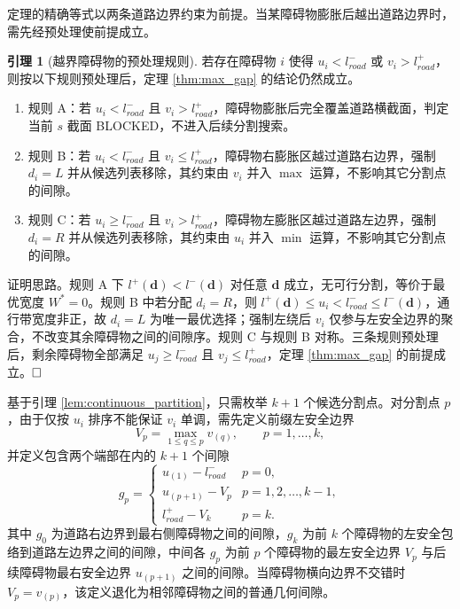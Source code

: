 \documentclass[a4paper,11pt]{ctexart}
\theoremstyle{definition}
\newtheorem{lemma}{引理}[section]
\begin{document}
定理的精确等式以两条道路边界约束为前提。当某障碍物膨胀后越出道路边界时，需先经预处理使前提成立。

\begin{lemma}[越界障碍物的预处理规则]
\label{lem:boundary_trim}
若存在障碍物 $i$ 使得 $u_i < l_{road}^{-}$ 或 $v_i > l_{road}^{+}$，则按以下规则预处理后，定理 \ref{thm:max_gap} 的结论仍然成立。
\begin{enumerate}
    \item 规则 A：若 $u_i < l_{road}^{-}$ 且 $v_i > l_{road}^{+}$，障碍物膨胀后完全覆盖道路横截面，判定当前 $s$ 截面 BLOCKED，不进入后续分割搜索。
    \item 规则 B：若 $u_i < l_{road}^{-}$ 且 $v_i \leq l_{road}^{+}$，障碍物右膨胀区越过道路右边界，强制 $d_i = L$ 并从候选列表移除，其约束由 $v_i$ 并入 $\max$ 运算，不影响其它分割点的间隙。
    \item 规则 C：若 $u_i \geq l_{road}^{-}$ 且 $v_i > l_{road}^{+}$，障碍物左膨胀区越过道路左边界，强制 $d_i = R$ 并从候选列表移除，其约束由 $u_i$ 并入 $\min$ 运算，不影响其它分割点的间隙。
\end{enumerate}
\end{lemma}

证明思路。规则 A 下 $l^{+}(\mathbf{d}) < l^{-}(\mathbf{d})$ 对任意 $\mathbf{d}$ 成立，无可行分割，等价于最优宽度 $W^{*}=0$。规则 B 中若分配 $d_i = R$，则 $l^{+}(\mathbf{d}) \leq u_i < l_{road}^{-} \leq l^{-}(\mathbf{d})$，通行带宽度非正，故 $d_i = L$ 为唯一最优选择；强制左绕后 $v_i$ 仅参与左安全边界的聚合，不改变其余障碍物之间的间隙序。规则 C 与规则 B 对称。三条规则预处理后，剩余障碍物全部满足 $u_j \geq l_{road}^{-}$ 且 $v_j \leq l_{road}^{+}$，定理 \ref{thm:max_gap} 的前提成立。$\hfill\Box$

基于引理 \ref{lem:continuous_partition}，只需枚举 $k+1$ 个候选分割点。对分割点 $p$，由于仅按 $u_i$ 排序不能保证 $v_i$ 单调，需先定义前缀左安全边界
\begin{equation}
    V_p = \max_{1 \leq q \leq p} v_{(q)}, \qquad p = 1, \ldots, k,
    \label{eq:prefix_v}
\end{equation}
并定义包含两个端部在内的 $k+1$ 个间隙
\begin{equation}
    g_p = \begin{cases}
        u_{(1)} - l_{road}^{-} & p = 0, \\[0.3em]
        u_{(p+1)} - V_p & p = 1, 2, \ldots, k-1, \\[0.3em]
        l_{road}^{+} - V_k & p = k.
    \end{cases}
    \label{eq:gap_def}
\end{equation}
其中 $g_0$ 为道路右边界到最右侧障碍物之间的间隙，$g_k$ 为前 $k$ 个障碍物的左安全包络到道路左边界之间的间隙，中间各 $g_p$ 为前 $p$ 个障碍物的最左安全边界 $V_p$ 与后续障碍物最右安全边界 $u_{(p+1)}$ 之间的间隙。当障碍物横向边界不交错时 $V_p = v_{(p)}$，该定义退化为相邻障碍物之间的普通几何间隙。
\end{document}
